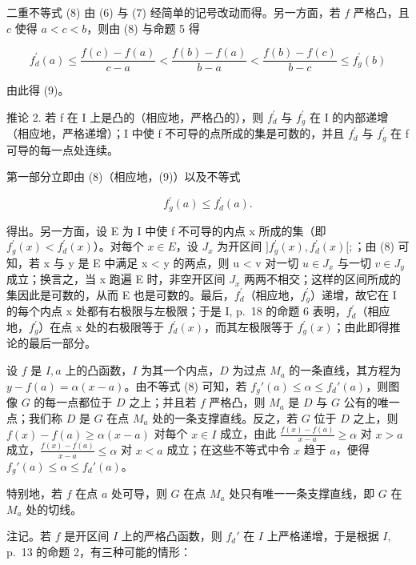 二重不等式 (8) 由 (6) 与 (7) 经简单的记号改动而得。另一方面，若 \(f\) 严格凸，且 \(c\) 使得 \(a < c < b\)，则由 (8) 与命题 5 得

\[
f _ {d} ^ {\prime} (a) \leqslant \frac {f (c) - f (a)}{c - a} <   \frac {f (b) - f (a)}{b - a} <   \frac {f (b) - f (c)}{b - c} \leqslant f _ {g} ^ {\prime} (b)
\]

由此得 (9)。

推论 2. 若 f 在 I 上是凸的（相应地，严格凸的），则 \(f_{d}^{\prime}\) 与 \(f_{g}^{\prime}\) 在 I 的内部递增（相应地，严格递增）；I 中使 f 不可导的点所成的集是可数的，并且 \(f_{d}^{\prime}\) 与 \(f_{g}^{\prime}\) 在 f 可导的每一点处连续。

第一部分立即由 (8)（相应地，(9)）以及不等式

\[
f _ {g} ^ {\prime} (a) \leqslant f _ {d} ^ {\prime} (a).
\]

得出。另一方面，设 E 为 I 中使 f 不可导的内点 x 所成的集（即 \(f_{g}^{\prime}(x) < f_{d}^{\prime}(x)\)）。对每个 \(x \in E\)，设 \(J_{x}\) 为开区间 \(]f_{g}^{\prime}(x), f_{d}^{\prime}(x)[;\)；由 (8) 可知，若 x 与 y 是 E 中满足 x \textless{} y 的两点，则 u \textless{} v 对一切 \(u \in J_{x}\) 与一切 \(v \in J_{y}\) 成立；换言之，当 x 跑遍 E 时，非空开区间 \(J_{x}\) 两两不相交；这样的区间所成的集因此是可数的，从而 E 也是可数的。最后，\(f_{d}^{\prime}\)（相应地，\(f_{g}^{\prime}\)）递增，故它在 I 的每个内点 x 处都有右极限与左极限；于是 I, p.~18 的命题 6 表明，\(f_{d}^{\prime}\)（相应地，\(f_{g}^{\prime}\)）在点 x 处的右极限等于 \(f_{d}^{\prime}(x)\)，而其左极限等于 \(f_{g}^{\prime}(x)\)；由此即得推论的最后一部分。

设 \(f\) 是 \(I, a\) 上的凸函数，\(I\) 为其一个内点，\(D\) 为过点 \(M_a\) 的一条直线，其方程为 \(y - f(a) = \alpha(x - a)\)。由不等式 (8) 可知，若 \(f_g'(a) \leqslant \alpha \leqslant f_d'(a)\)，则图像 \(G\) 的每一点都位于 \(D\) 之上；并且若 \(f\) 严格凸，则 \(M_a\) 是 \(D\) 与 \(G\) 公有的唯一点；我们称 \(D\) 是 \(G\) 在点 \(M_a\) 处的一条支撑直线。反之，若 \(G\) 位于 \(D\) 之上，则 \(f(x) - f(a) \geqslant \alpha(x - a)\) 对每个 \(x \in I\) 成立，由此 \(\frac{f(x) - f(a)}{x - a} \geqslant \alpha\) 对 \(x > a\) 成立，\(\frac{f(x) - f(a)}{x - a} \leqslant \alpha\) 对 \(x < a\) 成立；在这些不等式中令 \(x\) 趋于 \(a\)，便得 \(f_g'(a) \leqslant \alpha \leqslant f_d'(a)\)。

特别地，若 \(f\) 在点 \(a\) 处可导，则 \(G\) 在点 \(M_a\) 处只有唯一一条支撑直线，即 \(G\) 在 \(M_a\) 处的切线。

注记。若 \(f\) 是开区间 \(I\) 上的严格凸函数，则 \(f_d'\) 在 \(I\) 上严格递增，于是根据 \(I\), p.~13 的命题 2，有三种可能的情形：


